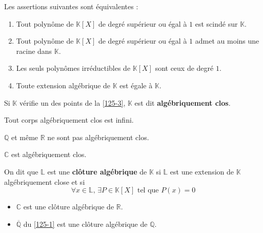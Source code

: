 
  \begin{proposition}
    \label{125-3}
    Les assertions suivantes sont équivalentes :
    \begin{enumerate}[label=(\roman*)]
      \item Tout polynôme de $\mathbb{K}[X]$ de degré supérieur ou égal à $1$ est scindé sur $\mathbb{K}$.
      \item Tout polynôme de $\mathbb{K}[X]$ de degré supérieur ou égal à $1$ admet au moins une racine dans $\mathbb{K}$.
      \item Les seuls polynômes irréductibles de $\mathbb{K}[X]$ sont ceux de degré $1$.
      \item Toute extension algébrique de $\mathbb{K}$ est égale à $\mathbb{K}$.
    \end{enumerate}
  \end{proposition}

  \begin{definition}
    Si $\mathbb{K}$ vérifie un des points de la \cref{125-3}, $\mathbb{K}$ est dit \textbf{algébriquement clos}.
  \end{definition}

  \begin{proposition}
    Tout corps algébriquement clos est infini.
  \end{proposition}

  \begin{cexample}
    $\mathbb{Q}$ et même $\mathbb{R}$ ne sont pas algébriquement clos.
  \end{cexample}

  \begin{theorem}
    $\mathbb{C}$ est algébriquement clos.
  \end{theorem}

  \begin{definition}
    On dit que $\mathbb{L}$ est une \textbf{clôture algébrique} de $\mathbb{K}$ si $\mathbb{L}$ est une extension de $\mathbb{K}$ algébriquement close et si
    \[ \forall x \in \mathbb{L}, \, \exists P \in \mathbb{K}[X] \text{ tel que } P(x) = 0 \]
  \end{definition}

  \begin{example}
    \begin{itemize}
      \item $\mathbb{C}$ est une clôture algébrique de $\mathbb{R}$.
      \item $\overline{\mathbb{Q}}$ du \cref{125-1} est une clôture algébrique de $\mathbb{Q}$.
    \end{itemize}
  \end{example}

